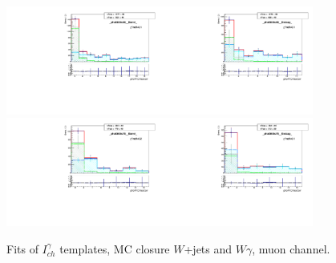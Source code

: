 \begin{figure}[htb]
\begin{center}
   \includegraphics[width=0.45\textwidth]{../figs/figs_v11/MUON_WGamma/MCclosureWjetsPlusWg/c_TEMPL_CHISO_UNblind__phoEt55to65__Barrel__RooFit_MCclosure.pdf}\includegraphics[width=0.45\textwidth]{../figs/figs_v11/MUON_WGamma/MCclosureWjetsPlusWg/c_TEMPL_CHISO_UNblind__phoEt55to65__Endcap__RooFit_MCclosure.pdf}\\
   \includegraphics[width=0.45\textwidth]{../figs/figs_v11/MUON_WGamma/MCclosureWjetsPlusWg/c_TEMPL_CHISO_UNblind__phoEt65to75__Barrel__RooFit_MCclosure.pdf}\includegraphics[width=0.45\textwidth]{../figs/figs_v11/MUON_WGamma/MCclosureWjetsPlusWg/c_TEMPL_CHISO_UNblind__phoEt65to75__Endcap__RooFit_MCclosure.pdf}\\
  \label{fig:templateFits_MCclosureWjetsPlusWg_CHISO_MUON_2}
  \caption{Fits of $I_{ch}^{\gamma}$ templates, MC closure $W$+jets and $W\gamma$, muon channel.}
  \end{center}
\end{figure}

